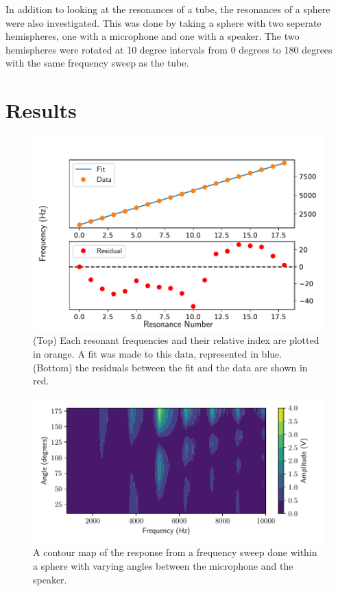 \documentclass[a4paper, 12pt, twocolumn]{article}
\begin{document}
In addition to looking at the resonances of a tube, the resonances of a sphere were also investigated. This was done by taking a sphere with two seperate hemispheres, one with a microphone and one with a speaker. The two hemispheres were rotated at 10 degree intervals from 0 degrees to 180 degrees with the same frequency sweep as the tube.  
\clearpage
\section{Results}
\begin{figure}[ht!]
	\centering
	\includegraphics[scale=0.75]{../fitting.pdf}
	\caption{(Top) Each resonant frequencies and their relative index are plotted in orange. A fit was made to this data, represented in blue. (Bottom) the residuals between the fit and the data are shown in red.}
	\label{fig:fit}
\end{figure}
\begin{figure}[t!]
	\centering
	\includegraphics[scale=1]{../Rotation.pdf}
	\caption{A contour map of the response from a frequency sweep done within a sphere with varying angles between the microphone and the speaker.}
	\label{fig:sphere}
\end{figure}
\end{document}
